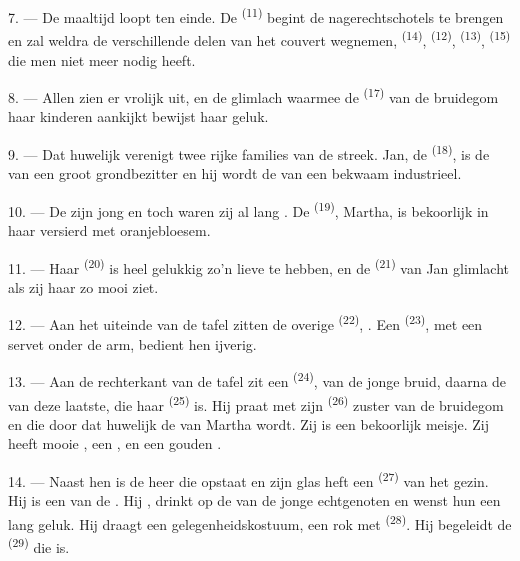 7. --- De maaltijd loopt ten einde. De  \textsuperscript{(11)} begint de
nagerechtschotels te brengen en zal weldra de verschillende delen van het couvert wegnemen,
 \textsuperscript{(14)},  \textsuperscript{(12)},
 \textsuperscript{(13)},
 \textsuperscript{(15)} die men niet meer nodig heeft.

\VUsaut{3.0mm}

8. --- Allen zien er vrolijk uit, en de glimlach waarmee de 
\textsuperscript{(17)} van de bruidegom haar kinderen aankijkt bewijst haar geluk.

9. --- Dat huwelijk verenigt twee rijke families van de streek. Jan, de
 \textsuperscript{(18)}, is de  van een groot
grondbezitter en hij wordt de  van een bekwaam industrieel.

10. --- De  zijn jong en toch waren zij al lang
. De  \textsuperscript{(19)}, Martha, is
bekoorlijk in haar  versierd met oranjebloesem.

11. --- Haar  \textsuperscript{(20)} is heel gelukkig zo'n lieve
 te hebben, en de  \textsuperscript{(21)} van Jan
glimlacht als zij haar  zo mooi ziet.

12. --- Aan het uiteinde van de tafel zitten de overige 
\textsuperscript{(22)}, . Een
 \textsuperscript{(23)}, met een servet onder de arm, bedient hen
ijverig.

\VUsaut{3.0mm}

13. --- Aan de rechterkant van de tafel zit een  \textsuperscript{(24)},
 van de jonge bruid, daarna de
 van deze laatste, die haar 
\textsuperscript{(25)} is. Hij praat met zijn  \textsuperscript{(26)}
zuster van de bruidegom en die door dat huwelijk de
 van Martha wordt. Zij is een bekoorlijk meisje. Zij heeft
mooie , een , en een gouden
.

14. --- Naast hen is de heer die opstaat en zijn glas heft een 
\textsuperscript{(27)} van het gezin. Hij is een van de .
Hij , drinkt op de
 van de jonge echtgenoten en wenst hun een lang geluk. Hij
draagt een gelegenheidskostuum, een rok met  \textsuperscript{(28)}. Hij
begeleidt de  \textsuperscript{(29)} die  is.

